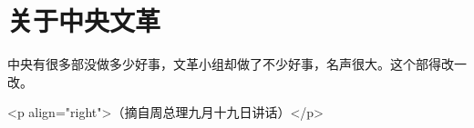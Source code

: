 \section[关于中央文革（一九六六年九月）]{关于中央文革}


中央有很多部没做多少好事，文革小组却做了不少好事，名声很大。这个部得改一改。

<p align="right">（摘自周总理九月十九日讲话）</p>


